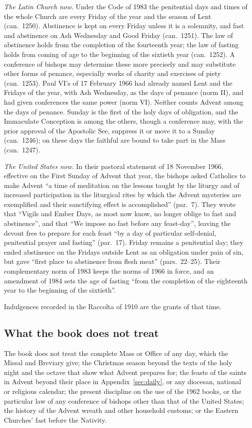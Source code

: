 \textit{The Latin Church now.} Under the Code of 1983 the penitential days and
times of the whole Church are every Friday of the year and the season of Lent
(can.~1250). Abstinence is kept on every Friday unless it is a solemnity, and
fast and abstinence on Ash Wednesday and Good Friday (can.~1251). The law of
abstinence holds from the completion of the fourteenth year; the law of fasting
holds from coming of age to the beginning of the sixtieth year (can.~1252). A
conference of bishops may determine these more precisely and may substitute
other forms of penance, especially works of charity and exercises of piety
(can.~1253). Paul VI's  of 17 February 1966 had already
named Lent and the Fridays of the year, with Ash Wednesday, as the days of
penance (norm II), and had given conferences the same power (norm VI). Neither
counts Advent among the days of penance. Sunday is the first of the holy days
of obligation, and the Immaculate Conception is among the others, though a
conference may, with the prior approval of the Apostolic See, suppress it or
move it to a Sunday (can.~1246); on these days the faithful are bound to take
part in the Mass (can.~1247).

\textit{The United States now.} In their pastoral statement of 18 November 1966,
effective on the First Sunday of Advent that year, the bishops asked Catholics
to make Advent ``a time of meditation on the lessons taught by the liturgy and
of increased participation in the liturgical rites by which the Advent
mysteries are exemplified and their sanctifying effect is accomplished''
(par.~7). They wrote that ``Vigils and Ember Days, as most now know, no longer
oblige to fast and abstinence'', and that ``We impose no fast before any
feast-day'', leaving the devout free to prepare for each feast ``by a day of
particular self-denial, penitential prayer and fasting'' (par.~17). Friday
remains a penitential day; they ended abstinence on the Fridays outside Lent as
an obligation under pain of sin, but gave ``first place to abstinence from flesh
meat'' (pars.~22--25). Their complementary norm of 1983 keeps the norms of 1966
in force, and an amendment of 1984 sets the age of fasting ``from the
completion of the eighteenth year to the beginning of the sixtieth''.

Indulgences recorded in the Raccolta of 1910 are the grants of that time.

\subsection{What the book does not treat}

The book does not treat the complete Mass or Office of any day, which the
Missal and Breviary give; the Christmas season beyond the texts of the holy
night and the octave that show what Advent prepares for; the feasts of the
saints in Advent beyond their place in Appendix~\ref{sec:daily}, or any
diocesan, national or religious calendar; the present discipline on the use of
the 1962 books, or the particular law of any conference of bishops other than
that of the United States; the history of the Advent wreath and other household
customs; or the Eastern Churches' fast before the Nativity.
